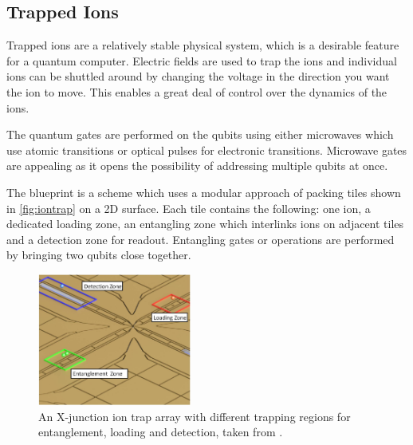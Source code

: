\subsection{Trapped Ions}

Trapped ions are a relatively stable physical system, which is a desirable feature for a quantum computer. Electric fields are used to trap the ions and individual ions can be shuttled around by changing the voltage in the direction you want the ion to move. This enables a great deal of control over the dynamics of the ions.

The quantum gates are performed on the qubits using either microwaves which use atomic transitions or optical pulses for electronic transitions. Microwave gates are appealing as it opens the possibility of addressing multiple qubits at once. 

The \cite{lekitsch2015blueprint} blueprint is a scheme which uses a modular approach of packing tiles shown in \autoref{fig:iontrap} on a 2D surface. Each tile contains the following: one ion, a dedicated loading zone, an entangling zone which interlinks ions on adjacent tiles and a detection zone for readout. Entangling gates or operations are performed by bringing two qubits close together. 

\begin{figure}[H]
    \centering
    \includegraphics[width=0.45\textwidth]{figures/impl/iontrap.png}
    \caption{An X-junction ion trap array with different trapping regions for entanglement, loading and detection, taken from \cite{lekitsch2015blueprint}.}
    \label{fig:iontrap}
\end{figure}

